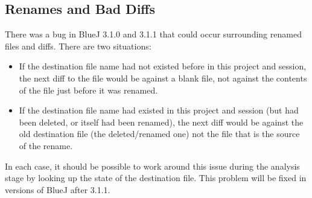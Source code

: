 \documentclass{report}
\begin{document}
\subsection{Renames and Bad Diffs}

There was a bug in BlueJ 3.1.0 and 3.1.1 that could occur surrounding renamed files and diffs.  There are two situations:

\begin{itemize}
\item If the destination file name had not existed before in this project and session, the next diff to the file would be against
a blank file, not against the contents of the file just before it was renamed.
\item If the destination file name had existed in this project and session (but had been deleted, or itself had been renamed),
the next diff would be against the old destination file (the deleted/renamed one) not the file that is the source of the rename.
\end{itemize}

In each case, it should be possible to work around this issue during the analysis stage by looking up the state of the destination file.
This problem will be fixed in versions of BlueJ after 3.1.1.

%
%
%
%
\end{document}
